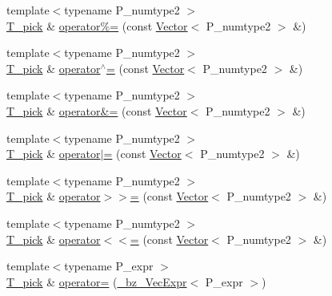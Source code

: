 \begin{DoxyCompactItemize}
\item 
{\footnotesize template$<$typename P\+\_\+numtype2 $>$ }\\\hyperlink{classVectorPick_ab257fd713ce0f2a81bc79059cec93ac9}{T\+\_\+pick} \& \hyperlink{classVectorPick_ae51a297fde3800340cac1c333da4d586}{operator\%=} (const \hyperlink{classVector}{Vector}$<$ P\+\_\+numtype2 $>$ \&)
\item 
{\footnotesize template$<$typename P\+\_\+numtype2 $>$ }\\\hyperlink{classVectorPick_ab257fd713ce0f2a81bc79059cec93ac9}{T\+\_\+pick} \& \hyperlink{classVectorPick_a90991ca7b98e90618894071777a4d7d6}{operator$^\wedge$=} (const \hyperlink{classVector}{Vector}$<$ P\+\_\+numtype2 $>$ \&)
\item 
{\footnotesize template$<$typename P\+\_\+numtype2 $>$ }\\\hyperlink{classVectorPick_ab257fd713ce0f2a81bc79059cec93ac9}{T\+\_\+pick} \& \hyperlink{classVectorPick_a6fcbb2dc3981196bf8762de7fe188630}{operator\&=} (const \hyperlink{classVector}{Vector}$<$ P\+\_\+numtype2 $>$ \&)
\item 
{\footnotesize template$<$typename P\+\_\+numtype2 $>$ }\\\hyperlink{classVectorPick_ab257fd713ce0f2a81bc79059cec93ac9}{T\+\_\+pick} \& \hyperlink{classVectorPick_abb26cc68ef0905f890c430c36cf3e64e}{operator$\vert$=} (const \hyperlink{classVector}{Vector}$<$ P\+\_\+numtype2 $>$ \&)
\item 
{\footnotesize template$<$typename P\+\_\+numtype2 $>$ }\\\hyperlink{classVectorPick_ab257fd713ce0f2a81bc79059cec93ac9}{T\+\_\+pick} \& \hyperlink{classVectorPick_abf08b5cb956b5dd3cf9843055bbb83aa}{operator$>$$>$=} (const \hyperlink{classVector}{Vector}$<$ P\+\_\+numtype2 $>$ \&)
\item 
{\footnotesize template$<$typename P\+\_\+numtype2 $>$ }\\\hyperlink{classVectorPick_ab257fd713ce0f2a81bc79059cec93ac9}{T\+\_\+pick} \& \hyperlink{classVectorPick_aab635cbe798a6cf1fc08ff0506ee6207}{operator$<$$<$=} (const \hyperlink{classVector}{Vector}$<$ P\+\_\+numtype2 $>$ \&)
\item 
{\footnotesize template$<$typename P\+\_\+expr $>$ }\\\hyperlink{classVectorPick_ab257fd713ce0f2a81bc79059cec93ac9}{T\+\_\+pick} \& \hyperlink{classVectorPick_ac9ebe3ec9a3b97f0972b4728142f7322}{operator=} (\hyperlink{class__bz__VecExpr}{\+\_\+bz\+\_\+\+Vec\+Expr}$<$ P\+\_\+expr $>$)
\item 

\end{DoxyCompactItemize}
